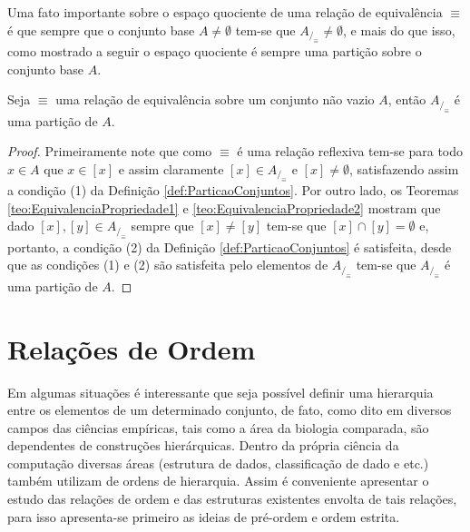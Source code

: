 Uma fato importante sobre o espaço quociente de uma relação de equivalência $\equiv$ é que sempre que o conjunto base $A \neq \emptyset$ tem-se que $A_{/_\equiv} \neq \emptyset$, e mais do que isso, como mostrado a seguir o espaço quociente é sempre uma partição sobre o conjunto base $A$.

\begin{teorema}
	Seja $\equiv$ uma relação de equivalência sobre um conjunto não vazio $A$, então $A_{/_\equiv}$ é uma partição de $A$.
\end{teorema}

\begin{proof}
	Primeiramente note que como $\equiv$ é uma relação reflexiva tem-se para todo $x \in A$ que $x \in [x]$ e assim claramente $[x] \in A_{/_\equiv}$ e $[x] \neq \emptyset$, satisfazendo assim a condição (1) da Definição \ref{def:ParticaoConjuntos}. Por outro lado, os Teoremas \ref{teo:EquivalenciaPropriedade1} e \ref{teo:EquivalenciaPropriedade2} mostram que dado $[x], [y] \in A_{/_\equiv}$ sempre que $[x] \neq [y]$ tem-se que  $[x] \cap [y] = \emptyset$ e, portanto, a condição (2) da Definição \ref{def:ParticaoConjuntos} é satisfeita, desde que as condições (1) e (2) são satisfeita pelo elementos de $A_{/_\equiv}$ tem-se que $A_{/_\equiv}$ é uma partição de $A$.
\end{proof}


\section{Relações de Ordem}\label{sec:Order}

Em algumas situações é interessante que seja possível definir uma hierarquia entre os elementos de um determinado conjunto, de fato, como dito em \cite{abe1991-TC} diversos campos das ciências empíricas, tais como a área da biologia comparada, são dependentes de construções hierárquicas. Dentro da própria ciência da computação diversas áreas (estrutura de dados, classificação de dado e etc.) também utilizam de ordens de hierarquia. Assim é conveniente apresentar o estudo das relações de ordem e das estruturas existentes envolta de tais relações, para isso apresenta-se primeiro as ideias de pré-ordem e ordem estrita.

